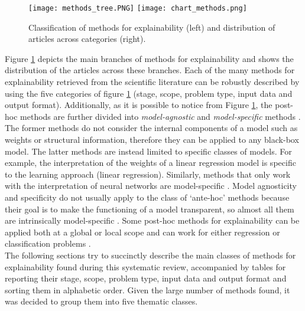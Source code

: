 \documentclass[final,1p,times]{elsarticle}
\begin{document}
\begin{figure}[!ht]
\begin{minipage}{\textwidth}
\centering
  \texttt{[image: methods\_tree.PNG]}
  \texttt{[image: chart\_methods.png]}
  \caption{Classification of methods for explainability (left) and  distribution of articles across categories (right).}
  \label{fig:methods_tree_sunburst}
\end{minipage}
\end{figure}

Figure \ref{fig:methods_tree_sunburst} depicts the main branches of methods for explainability and shows the distribution of the articles across these branches.
Each of the many methods for explainability retrieved from the scientific literature can be robustly described by using the five categories of figure \ref{fig:methods_tree_sunburst} (stage, scope, problem type, input data and output format). 
Additionally, as it is possible to notice from Figure \ref{fig:methods_tree_sunburst}, the post-hoc methods are further divided into \textit{model-agnostic} and \textit{model-specific} methods \cite{guidotti2018survey}.
The former methods do not consider the internal components of a model such as weights or structural information, therefore they can be applied to any black-box model.
The latter methods are instead limited to specific classes of models. For example, the interpretation of the weights of a linear regression model is specific to the learning approach (linear regression). Similarly, methods that only work with the interpretation of neural networks are model-specific \cite{arras2019evaluating, dam2018explainable, zhang2018visual}.
Model agnosticity and specificity do not usually apply to the class of `ante-hoc' methods because their goal is to make the functioning of a model transparent, so almost all them are intrinsically model-specific \cite{dovsilovic2018explainable}. 
Some post-hoc methods for explainability can be applied both at a global or local scope \cite{bologna2018comparison} and can work for either regression or classification problems \cite{spinner2019explainer}. \\

The following sections try to succinctly describe the main classes of methods for explainability found during this systematic review, accompanied by tables for reporting their stage, scope, problem type, input data and output format and sorting them in alphabetic order.
Given the large number of methods found, it was decided to group them into five thematic classes.
\end{document}
